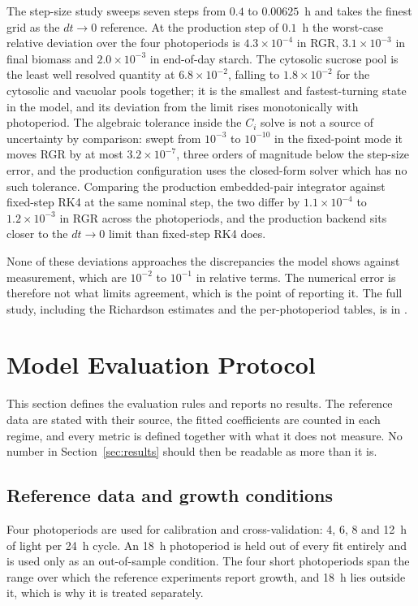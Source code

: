 The step-size study sweeps seven steps from $0.4$ to $0.00625$~h and takes the
finest grid as the $dt \to 0$ reference. At the production step of $0.1$~h the
worst-case relative deviation over the four photoperiods is
$4.3\times10^{-4}$ in RGR, $3.1\times10^{-3}$ in final biomass and
$2.0\times10^{-3}$ in end-of-day starch. The cytosolic sucrose pool is the least
well resolved quantity at $6.8\times10^{-2}$, falling to $1.8\times10^{-2}$ for
the cytosolic and vacuolar pools together; it is the smallest and fastest-turning
state in the model, and its deviation from the limit rises monotonically with
photoperiod. The algebraic tolerance inside the $C_i$ solve is not a source of
uncertainty by comparison: swept from $10^{-3}$ to $10^{-10}$ in the
fixed-point mode it moves RGR by at most $3.2\times10^{-7}$, three orders of
magnitude below the step-size error, and the production configuration uses the
closed-form solver which has no such tolerance. Comparing the production
embedded-pair integrator against fixed-step RK4 at the same nominal step, the
two differ by $1.1\times10^{-4}$ to $1.2\times10^{-3}$ in RGR across the
photoperiods, and the production backend sits closer to the $dt \to 0$ limit
than fixed-step RK4 does.

None of these deviations approaches the discrepancies the model shows against
measurement, which are $10^{-2}$ to $10^{-1}$ in relative terms. The numerical
error is therefore not what limits agreement, which is the point of reporting
it. The full study, including the Richardson estimates and the per-photoperiod
tables, is in .

\section{Model Evaluation Protocol}
\label{sec:protocol}

This section defines the evaluation rules and reports no results. The reference
data are stated with their source, the fitted coefficients are counted in each
regime, and every metric is defined together with what it does not measure. No
number in Section~\ref{sec:results} should then be readable as more than it is.

\subsection{Reference data and growth conditions}

Four photoperiods are used for calibration and cross-validation: 4, 6, 8 and
12~h of light per 24~h cycle. An 18~h photoperiod is held out of every fit
entirely and is used only as an out-of-sample condition. The four short
photoperiods span the range over which the reference experiments report growth,
and 18~h lies outside it, which is why it is treated separately.

